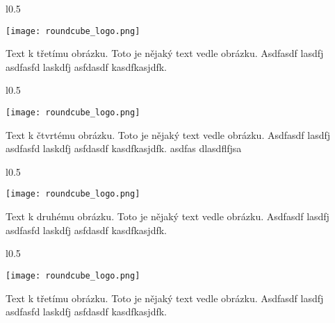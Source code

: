 \documentclass[12pt,a4paper,twoside]{book}
\begin{document}
\begin{wrapfigure}{l}{0.5\textwidth}
  \vspace{-20pt}
  \begin{center}
    \texttt{[image: roundcube\_logo.png]}
  \end{center}
  \vspace{-20pt}
\end{wrapfigure}

Text k třetímu obrázku. Toto je nějaký text vedle obrázku. Asdfasdf lasdfj asdfasfd laskdfj asfdasdf kasdfkasjdfk.
\newline

\begin{wrapfigure}{l}{0.5\textwidth}
  \vspace{-20pt}
  \begin{center}
    \texttt{[image: roundcube\_logo.png]}
  \end{center}
  \vspace{-20pt}
\end{wrapfigure}

Text k čtvrtému obrázku. Toto je nějaký text vedle obrázku. Asdfasdf lasdfj asdfasfd laskdfj asfdasdf kasdfkasjdfk.
\newline
asdfas dlasdflfjsa 
\begin{wrapfigure}{l}{0.5\textwidth}
  \vspace{-20pt}
  \begin{center}
    \texttt{[image: roundcube\_logo.png]}
  \end{center}
  \vspace{-20pt}
\end{wrapfigure}

Text k druhému obrázku. Toto je nějaký text vedle obrázku. Asdfasdf lasdfj asdfasfd laskdfj asfdasdf kasdfkasjdfk.
\newline

\begin{wrapfigure}{l}{0.5\textwidth}
  \vspace{-20pt}
  \begin{center}
    \texttt{[image: roundcube\_logo.png]}
  \end{center}
  \vspace{-20pt}
\end{wrapfigure}

Text k třetímu obrázku. Toto je nějaký text vedle obrázku. Asdfasdf lasdfj asdfasfd laskdfj asfdasdf kasdfkasjdfk.
\newline
\end{document}
